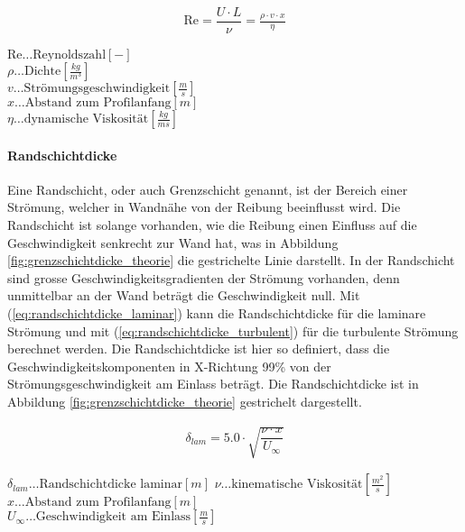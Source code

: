 \begin{align}
\text{Re}= \dfrac{U \cdot L}{\nu} = \frac{\rho \cdot v \cdot x}{\eta}
\label{eq:reynoldszahl} 
\end{align}
\begin{center}
\begin{minipage}{0.5\linewidth}
$\text{Re} \dots \text{Reynoldszahl} \left[-\right]$ \\
$\rho \dots \text{Dichte} \left[\frac{kg}{m^3}\right]$ \\
$v \dots \text{Strömungsgeschwindigkeit} \left[\frac{m}{s}\right]$ \\
$x \dots \text{Abstand zum Profilanfang} \left[m\right]$ \\
$\eta \dots \text{dynamische Viskosität} \left[\frac{kg}{ms}\right]$ \\
\end{minipage}
\end{center}


\paragraph{Randschichtdicke}
\label{para:randschichtdicke_theorie}
$\;$ \\Eine Randschicht, oder auch Grenzschicht genannt, ist der Bereich einer Strömung, welcher in Wandnähe von der Reibung beeinflusst wird. Die Randschicht ist solange vorhanden, wie die Reibung einen Einfluss auf die Geschwindigkeit senkrecht zur Wand hat, was in Abbildung \ref{fig:grenzschichtdicke_theorie} die gestrichelte Linie darstellt. In der Randschicht sind grosse Geschwindigkeitsgradienten der Strömung vorhanden, denn unmittelbar an der Wand beträgt die Geschwindigkeit null. Mit (\ref{eq:randschichtdicke_laminar}) kann die Randschichtdicke für die laminare Strömung und mit (\ref{eq:randschichtdicke_turbulent}) für die turbulente Strömung berechnet werden. Die Randschichtdicke ist hier so definiert, dass die Geschwindigkeitskomponenten in X-Richtung 99\% von der Strömungsgeschwindigkeit am Einlass beträgt. Die Randschichtdicke ist in Abbildung \ref{fig:grenzschichtdicke_theorie} gestrichelt dargestellt.

\begin{align}
\delta_{lam} = 5.0 \cdot \sqrt{\dfrac{\nu \cdot x}{U_{\infty}}}
\label{eq:randschichtdicke_laminar} 
\end{align}
\begin{center}
\begin{minipage}{0.5\linewidth}
$\delta_{lam} \dots \text{Randschichtdicke laminar} \left[m\right]$
$\nu \dots \text{kinematische Viskosität} \left[\frac{m^2}{s}\right]$ \\
$x \dots \text{Abstand zum Profilanfang} \left[m\right]$ \\
$U_{\infty} \dots \text{Geschwindigkeit am Einlass} \left[\frac{m}{s}\right]$\\
\end{minipage}
\end{center}


